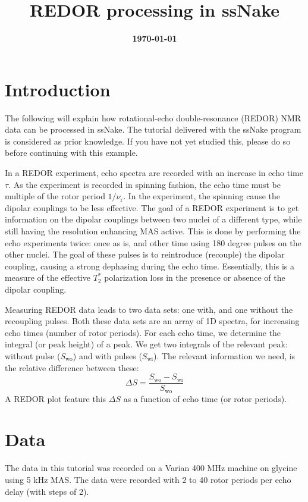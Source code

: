 \documentclass[11pt,a4paper]{article}
\title{\color{black}\fontfamily{SourceSansPro-LF}\bfseries REDOR processing in ssNake}
\author{}
\date{\color{black}\fontfamily{SourceSansPro-LF}\bfseries \today}
\begin{document}

\maketitle

\section{Introduction}
The following will explain how rotational-echo double-resonance (REDOR) NMR data can be processed in ssNake.
 The
tutorial delivered with the ssNake program is considered as prior knowledge. If you have not yet
studied this, please do so before continuing with this example.

In a REDOR experiment, echo spectra are recorded with an increase in echo time $\tau$. As the
experiment is recorded in spinning fashion, the echo time must be multiple of the rotor period
$1/\nu_\text{r}$. In the experiment, the spinning cause the dipolar couplings to be less effective.
The goal of a REDOR experiment is to get information on the dipolar couplings between two nuclei of
a different type, while still having the resolution enhancing MAS active. This is done by performing
the echo experiments twice: once as is, and other time using 180 degree pulses on the other nuclei.
The goal of these pulses is to reintroduce (recouple) the dipolar coupling, causing a strong dephasing during
the echo time. Essentially, this is a measure of the effective $T_2^*$ polarization loss in the
presence or absence of the dipolar coupling.

Measuring REDOR data leads to two data sets: one with, and one without the recoupling pulses. Both
these data sets are an array of 1D spectra, for increasing echo times (number of rotor periods). For
each echo time, we determine the integral (or peak height) of a peak. We get two integrals of the relevant peak: without pulse ($S_\text{wo}$) and with
pulses ($S_\text{wi}$). The relevant information we need, is the relative difference between these:
\begin{equation*}
  \Delta S = \frac{S_\text{wo} - S_\text{wi}}{S_\text{wo}}
\end{equation*}
A REDOR plot feature this $\Delta S$ as a function of echo time (or rotor periods).





\section{Data}
The data in this tutorial was recorded on a Varian 400 MHz machine on glycine using 5 kHz MAS. The
data were recorded with 2 to 40 rotor periods per echo delay (with steps of 2).
\end{document}
